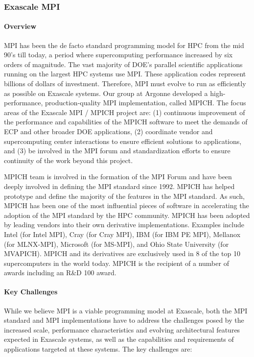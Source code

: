 \subsubsection{ Exascale MPI} \label{subsubsect:mpich}
\paragraph{Overview}

MPI has been the de facto standard programming model for HPC from the
mid 90's till today, a period where supercomputing performance
increased by six orders of magnitude.  The vast majority of DOE's
parallel scientific applications running on the largest HPC systems
use MPI.  These application codes represent billions of dollars of
investment.  Therefore, MPI must evolve to run as efficiently as
possible on Exascale systems.  Our group at Argonne developed a
high-performance, production-quality MPI implementation, called MPICH.
The focus areas of the Exascale MPI / MPICH project are: (1)
continuous improvement of the performance and capabilities of the
MPICH software to meet the demands of ECP and other broader DOE
applications, (2) coordinate vendor and supercomputing center
interactions to ensure efficient solutions to applications, and (3) be
involved in the MPI forum and standardization efforts to ensure
continuity of the work beyond this project.

MPICH team is  involved in the formation of the MPI Forum and have been
deeply involved in defining the MPI standard since 1992. MPICH has helped
prototype and define the majority of the features in the MPI standard.
As such, MPICH has been one of the most influential pieces of software in accelerating
the adoption of the MPI standard by the HPC community. MPICH has been adopted by leading
vendors into their own derivative implementations. Examples include Intel (for Intel MPI),
Cray (for Cray MPI), IBM (for IBM PE MPI), Mellanox (for MLNX-MPI), Microsoft (for MS-MPI),
and Ohio State University (for MVAPICH). MPICH and its derivatives are exclusively used in
8 of the top 10 supercomputers in the world today.
MPICH is the recipient of a number of awards including an R\&D 100 award.

\paragraph{Key  Challenges}

While we believe MPI is a viable programming model at Exascale, both
the MPI standard and MPI implementations have to address the
challenges posed by the increased scale, performance characteristics
and evolving architectural features expected in Exascale systems, as
well as the capabilities and requirements of applications targeted at
these systems.  The key challenges are:

